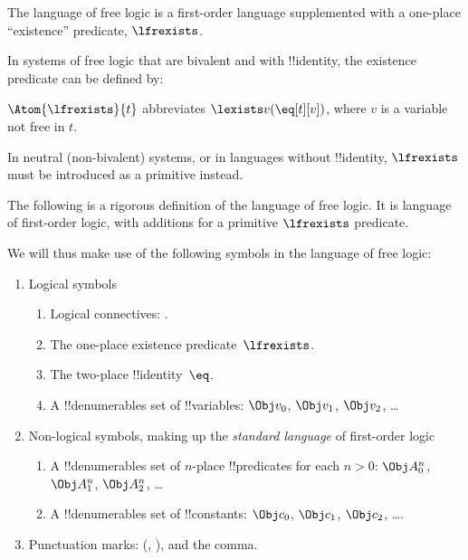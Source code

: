 \documentclass[../../../include/open-logic-section]{subfiles}
\begin{document}


The language of free logic is a first-order language supplemented with a 
one-place ``existence'' predicate, $\lfrexists$.

In systems of free logic that are bivalent and with !!{identity}, the 
existence predicate can be defined by:

\begin{defn}
$\Atom{\lfrexists}{t}$ abbreviates $\lexists v (\eq[t][v])$, 
where $v$ is a variable not free in $t$.
\end{defn}

In neutral (non-bivalent) systems, or in languages without !!{identity}, 
$\lfrexists$ must be introduced as a primitive instead.

The following is a rigorous definition of the language of free logic.
It is language of first-order logic, with additions
for a primitive $\lfrexists$ predicate.

We will thus make use of the following symbols in the language of 
free logic: 

\begin{enumerate}
\item Logical symbols
\begin{enumerate}
\item Logical connectives:
  \startycommalist
  .
\item The one-place existence predicate~$\lfrexists$.
\item The two-place !!{identity}~$\eq$.
\item A !!{denumerable}s set of !!{variable}s: $\Obj v_0$, $\Obj v_1$, $\Obj
  v_2$, \dots
\end{enumerate}
\item Non-logical symbols, making up the \emph{standard
  language} of first-order logic
\begin{enumerate}
\item A !!{denumerable}s set of $n$-place !!{predicate}s for each $n>0$: $\Obj
  A^n_0$, $\Obj A^n_1$, $\Obj A^n_2$, \dots
\item A !!{denumerable}s set of !!{constant}s: $\Obj c_0$, $\Obj c_1$, $\Obj
  c_2$, \dots.
\end{enumerate}
\item Punctuation marks: (, ), and the comma.
\end{enumerate}
\end{document}
